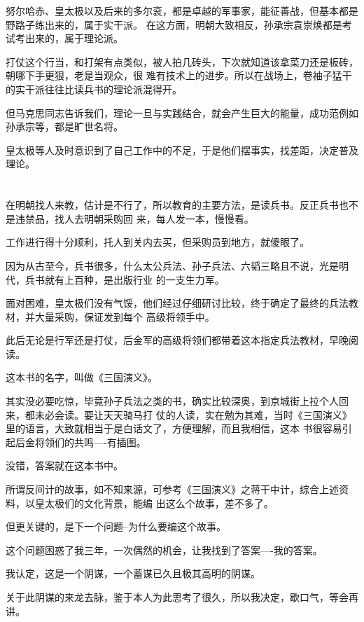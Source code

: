 \documentclass[11pt,a4paper,onecolumn]{article}
\begin{document}
努尔哈赤、皇太极以及后来的多尔衮，都是卓越的军事家，能征善战，但基本都是野路子练出来的，属于实干派。
在这方面，明朝大致相反，孙承宗袁崇焕都是考试考出来的，属于理论派。

打仗这个行当，和打架有点类似，被人拍几砖头，下次就知道该拿菜刀还是板砖，朝哪下手更狠，老是当观众，很
难有技术上的进步。所以在战场上，卷袖子猛干的实干派往往比读兵书的理论派混得开。

但马克思同志告诉我们，理论一旦与实践结合，就会产生巨大的能量，成功范例如孙承宗等，都是旷世名将。

皇太极等人及时意识到了自己工作中的不足，于是他们摆事实，找差距，决定普及理论。

\section[\thesection]{}

在明朝找人来教，估计是不行了，所以教育的主要方法，是读兵书。反正兵书也不是违禁品，找人去明朝采购回
来，每人发一本，慢慢看。

工作进行得十分顺利，托人到关内去买，但采购员到地方，就傻眼了。

因为从古至今，兵书很多，什么太公兵法、孙子兵法、六韬三略且不说，光是明代，兵书就有上百种，是出版行业
的一支生力军。

面对困难，皇太极们没有气馁，他们经过仔细研讨比较，终于确定了最终的兵法教材，并大量采购，保证发到每个
高级将领手中。

此后无论是行军还是打仗，后金军的高级将领们都带着这本指定兵法教材，早晚阅读。

这本书的名字，叫做《三国演义》。

其实没必要吃惊，毕竟孙子兵法之类的书，确实比较深奥，到京城街上拉个人回来，都未必会读。要让天天骑马打
仗的人读，实在勉为其难，当时《三国演义》里的语言，大致就相当于是白话文了，方便理解，而且我相信，这本
书很容易引起后金将领们的共鸣----有插图。

没错，答案就在这本书中。

所谓反间计的故事，如不知来源，可参考《三国演义》之蒋干中计，综合上述资料，以皇太极们的文化背景，能编
出这么个故事，差不多了。

但更关键的，是下一个问题--为什么要编这个故事。

这个问题困惑了我三年，一次偶然的机会，让我找到了答案----我的答案。

我认定，这是一个阴谋，一个蓄谋已久且极其高明的阴谋。

关于此阴谋的来龙去脉，鉴于本人为此思考了很久，所以我决定，歇口气，等会再讲。
\end{document}
